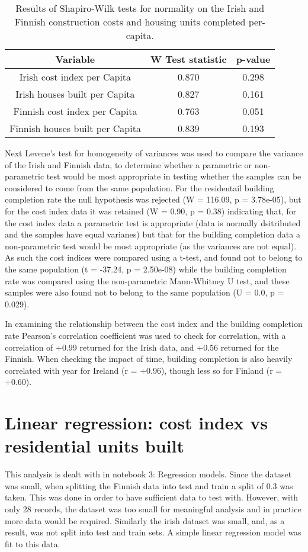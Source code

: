 \documentclass[hidelinks,12pt,oneside]{report} %
\begin{document}
\begin{table}[h!]
\centering
\begin{tabular}{||c | c | c ||} 
 \hline
 Variable & W Test statistic & p-value \\ [0.0ex] 
 \hline\hline
 Irish cost index per Capita & 0.870 & 0.298 \\ 
 \hline
 Irish houses built per Capita & 0.827 & 0.161 \\
 \hline
 Finnish cost index per Capita & 0.763 & 0.051 \\
 \hline
  Finnish houses built per Capita & 0.839 & 0.193 \\ [0.0ex] 
 \hline
\end{tabular}
\caption{Results of Shapiro-Wilk tests for normality on the Irish and Finnish construction costs and housing units completed per-capita.}
\label{table:2}
\end{table}
 
Next Levene's test for homogeneity of variances was used to compare the variance of the Irish and Finnish data, to determine whether a parametric or non-parametric test would be most appropriate in testing whether the samples can be considered to come from the same population. For the residentail building completion rate the null hypothesis was rejected (W = 116.09, p = 3.78e-05), but for the cost index data it was retained (W = 0.90, p = 0.38) indicating that, for the cost index data a parametric test is appropriate (data is normally dsitributed and the samples have equal varianes) but that for the building completion data a non-parametric test would be most appropriate (as the variances are not equal). As such the cost indices were compared using a t-test, and found not to belong to the same population (t = -37.24, p = 2.50e-08) while the building completion rate was compared using the non-parametric Mann-Whitney U test, and these samples were also found not to belong to the same population (U = 0.0, p = 0.029).

In examining the relationship between the cost index and the building completion rate Pearson's correlation coefficient was used to check for correlation, with a correlation of +0.99 returned for the Irish data, and +0.56 returned for the Finnish. When checking the impact of time, building completion is also heavily correlated with year for Ireland (r = +0.96), though less so for Finland (r = +0.60).

\section{Linear regression: cost index vs residential units built}
This analysis is dealt with in notebook 3: Regression models. Since the dataset was small, when splitting the Finnish data  into test and train a split of 0.3 was taken. This was done in order to have sufficient data to test with. However, with only 28 records, the dataset was too small for meaningful analysis and in practice more data would be required. Similarly the irish dataset was small, and, as a result, was not split into test and train sets. A simple linear regression model was fit to this data.
\end{document}

